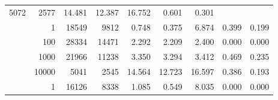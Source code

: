\begin{table}
\begin{tabular}{rrrrrrrrr}
							     5072  & 2577  
	                           & 14.481 & 12.387 & 16.752
	                           & 0.601 & 0.301  \\
	                
	            
	        
				\noalign{\smallskip}\hline
				\multirow{ 4 }{*}{ 80000 } &
				
					
					 
					\multirow{ 1 }{*}{ 1 } &
					
						
							    
							     18549  & 9812  
	                           & 0.748 & 0.375 & 6.874
	                           & 0.399 & 0.199  \\
	                
	            
					 &  
					 
					\multirow{ 1 }{*}{ 100 } &
					
						
							    
							     28334  & 14471  
	                           & 2.292 & 2.209 & 2.400
	                           & 0.000 & 0.000  \\
	                
	            
					 &  
					 
					\multirow{ 1 }{*}{ 1000 } &
					
						
							    
							     21966  & 11238  
	                           & 3.350 & 3.294 & 3.412
	                           & 0.469 & 0.235  \\
	                
	            
					 &  
					 
					\multirow{ 1 }{*}{ 10000 } &
					
						
							    
							     5041  & 2545  
	                           & 14.564 & 12.723 & 16.597
	                           & 0.386 & 0.193  \\
	                
	            
	        
				\noalign{\smallskip}\hline
				\multirow{ 4 }{*}{ 160000 } &
				
					
					 
					\multirow{ 1 }{*}{ 1 } &
					
						
							    
							     16126  & 8338  
	                           & 1.085 & 0.549 & 8.035
	                           & 0.000 & 0.000  \\
	                

\end{tabular}
\end{table}
